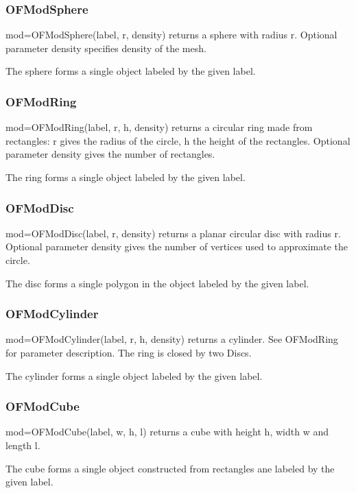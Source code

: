 \documentclass[a4paper]{article}
\begin{document}
\subsubsection{OFModSphere}

mod=OFModSphere(label, r, density) returns a sphere with radius
r. Optional parameter density specifies density of the mesh.

The sphere forms a single object labeled by the given label.

\subsubsection{OFModRing}

mod=OFModRing(label, r, h, density) returns a circular ring made from
rectangles: r gives the radius of the circle, h the height of the
rectangles. Optional parameter density gives the number of rectangles.

The ring forms a single object labeled by the given label.

\subsubsection{OFModDisc}

mod=OFModDisc(label, r, density) returns a planar circular disc with
radius r. Optional parameter density gives the number of vertices used
to approximate the circle.

The disc forms a single polygon in the object labeled by the given
label.

\subsubsection{OFModCylinder}

mod=OFModCylinder(label, r, h, density) returns a cylinder. See
OFModRing for parameter description. The ring is closed by two Discs.

The cylinder forms a single object labeled by the given label.

\subsubsection{OFModCube}

mod=OFModCube(label, w, h, l) returns a cube with height h, width w
and length l.

The cube forms a single object constructed from rectangles ane labeled
by the given label.
\end{document}

